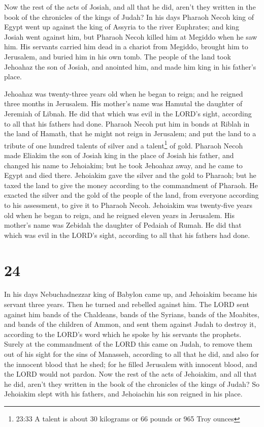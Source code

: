  Now the rest of the acts of Josiah, and all that he did,
aren't they written in the book of the chronicles of the kings of Judah?
 In his days Pharaoh Necoh king of Egypt went up against
the king of Assyria to the river Euphrates; and king Josiah went against
him, but Pharaoh Necoh killed him at Megiddo when he saw him.
 His servants carried him dead in a chariot from Megiddo,
brought him to Jerusalem, and buried him in his own tomb. The people of
the land took Jehoahaz the son of Josiah, and anointed him, and made him
king in his father's place.

 Jehoahaz was twenty-three years old when he began to
reign; and he reigned three months in Jerusalem. His mother's name was
Hamutal the daughter of Jeremiah of Libnah.  He did that
which was evil in the LORD's sight, according to all that his fathers
had done.  Pharaoh Necoh put him in bonds at Riblah in the
land of Hamath, that he might not reign in Jerusalem; and put the land
to a tribute of one hundred talents of silver and a talent\footnote{23:33
  A talent is about 30 kilograms or 66 pounds or 965 Troy ounces} of
gold.  Pharaoh Necoh made Eliakim the son of Josiah king in
the place of Josiah his father, and changed his name to Jehoiakim; but
he took Jehoahaz away, and he came to Egypt and died there.
 Jehoiakim gave the silver and the gold to Pharaoh; but he
taxed the land to give the money according to the commandment of
Pharaoh. He exacted the silver and the gold of the people of the land,
from everyone according to his assessment, to give it to Pharaoh Necoh.
 Jehoiakim was twenty-five years old when he began to
reign, and he reigned eleven years in Jerusalem. His mother's name was
Zebidah the daughter of Pedaiah of Rumah.  He did that
which was evil in the LORD's sight, according to all that his fathers
had done.

\hypertarget{section-23}{%
\section{24}\label{section-23}}

 In his days Nebuchadnezzar king of Babylon came up, and
Jehoiakim became his servant three years. Then he turned and rebelled
against him.  The LORD sent against him bands of the
Chaldeans, bands of the Syrians, bands of the Moabites, and bands of the
children of Ammon, and sent them against Judah to destroy it, according
to the LORD's word which he spoke by his servants the prophets.
 Surely at the commandment of the LORD this came on Judah,
to remove them out of his sight for the sins of Manasseh, according to
all that he did,  and also for the innocent blood that he
shed; for he filled Jerusalem with innocent blood, and the LORD would
not pardon.  Now the rest of the acts of Jehoiakim, and all
that he did, aren't they written in the book of the chronicles of the
kings of Judah?  So Jehoiakim slept with his fathers, and
Jehoiachin his son reigned in his place.

